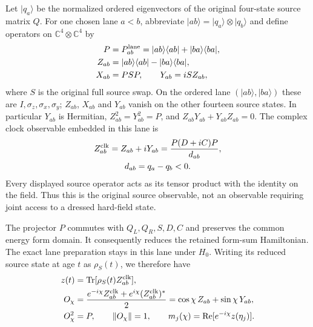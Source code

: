 Let $|q_a\rangle$ be the normalized ordered eigenvectors of the original
four-state source matrix $Q$. For one chosen lane $a<b$, abbreviate
$|ab\rangle=|q_a\rangle\otimes|q_b\rangle$ and define operators on
$\mathbb C^4\otimes\mathbb C^4$ by
\begin{equation}
\begin{aligned}
 P&=P^{\rm lane}_{ab}=|ab\rangle\langle ab|+|ba\rangle\langle ba|,\\
 Z_{ab}&=|ab\rangle\langle ab|-|ba\rangle\langle ba|,\\
 X_{ab}&=PSP,\qquad Y_{ab}=iSZ_{ab},
\end{aligned}
\label{eq:chvi-decoder-embedded-paulis}
\end{equation}
where $S$ is the original full source swap. On the ordered lane
$(|ab\rangle,|ba\rangle)$ these are $I,\sigma_z,\sigma_x,\sigma_y$;
$Z_{ab}$, $X_{ab}$ and $Y_{ab}$ vanish on the other fourteen source
states. In particular $Y_{ab}$ is Hermitian,
$Z_{ab}^2=Y_{ab}^2=P$, and $Z_{ab}Y_{ab}+Y_{ab}Z_{ab}=0$.
The complex clock observable embedded in this lane is
\begin{equation}
\begin{gathered}
Z^{\rm clk}_{ab}=Z_{ab}+iY_{ab}
   =\frac{P(D+iC)P}{d_{ab}},
 \\
 d_{ab}=q_a-q_b<0.
\end{gathered}
\label{eq:chvi-decoder-clock-operator}
\end{equation}
Every displayed source operator acts as its tensor product with the
identity on the field. Thus this is the original source observable,
not an observable requiring joint access to a dressed hard-field state.

The projector $P$ commutes with $Q_L,Q_R,S,D,C$ and preserves the common
energy form domain. It consequently reduces the retained form-sum
Hamiltonian. The exact lane preparation stays in this lane under $H_0$.
Writing its reduced source state at age $t$ as $\rho_S(t)$, we therefore
have
\begin{equation}
\begin{aligned}
 z(t)&=\operatorname{Tr}[\rho_S(t)Z^{\rm clk}_{ab}],\\
 O_\chi&=\frac{e^{-i\chi}Z^{\rm clk}_{ab}
                    +e^{i\chi}(Z^{\rm clk}_{ab})^*}{2}
       =\cos\chi\,Z_{ab}+\sin\chi\,Y_{ab},\\
 O_\chi^2&=P,\qquad \|O_\chi\|=1,\qquad
 m_j(\chi)=\operatorname{Re}[e^{-i\chi}z(\eta_j)].
\end{aligned}
\label{eq:chvi-decoder-quadrature}
\end{equation}

